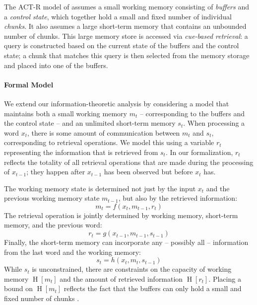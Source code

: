 \documentclass[11pt,letterpaper]{article}
\begin{document}
The ACT-R model of \cite{lewis-activation-based-2005} assumes a small working memory consisting of \emph{buffers} and a \emph{control state}, which together hold a small and fixed number of individual \emph{chunks}.
It also assumes a large short-term memory that contains an unbounded number of chunks.
This large memory store is accessed via \emph{cue-based retrieval}: a query is constructed based on the current state of the buffers and the control state; a chunk that matches this query is then selected from the memory storage and placed into one of the buffers.

\paragraph{Formal Model}
We extend our information-theoretic analysis by considering a model that maintains both a small working memory $m_t$ -- corresponding to the buffers and the control state -- and an unlimited short-term memory $s_t$.
When processing a word $x_t$, there is some amount of communication between $m_t$ and $s_t$, corresponding to retrieval operations.
We model this using a variable $r_t$ representing the information that is retrieved from $s_t$.
In our formalization, $r_t$ reflects the totality of all retrieval operations that are made during the processing of $x_{t-1}$; they happen after $x_{t-1}$ has been observed but before $x_t$ has.

The working memory state is determined not just by the input $x_t$ and the previous working memory state $m_{t-1}$, but also by the retrieved information:
\begin{equation}
	m_t = f(x_t, m_{t-1}, r_t) 
\end{equation}
The retrieval operation is jointly determined by working memory, short-term memory, and the previous word:
\begin{equation}\label{eq:rt}
	r_t = g(x_{t-1}, m_{t-1}, s_{t-1}) 
\end{equation}
Finally, the short-term memory can incorporate any -- possibly all -- information from the last word and the working memory:
\begin{equation}
	s_t = h(x_{t}, m_{t}, s_{t-1}) 
\end{equation}
While $s_t$ is unconstrained, there are constraints on the capacity of working memory $\operatorname{H}[m_t]$ and the amount of retrieved information $\operatorname{H}[r_t]$.
Placing a bound on $\operatorname{H}[m_t]$ reflects the fact that the buffers can only hold a small and fixed number of chunks \citep{lewis-activation-based-2005}.
\end{document}
